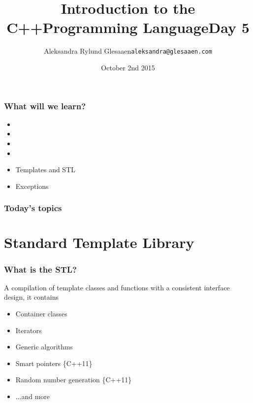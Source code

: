 \documentclass[14pt,a4paper,dvipsnames,usenames]{beamer}
\title[C++ Day5]{Introduction to the C++\newline{}Programming Language\newline{}\newline{}\fontsize{16pt}{16pt}\selectfont{}Day 5}
\author{\texorpdfstring{%
    Aleksandra Rylund Glesaaen\newline\fontsize{12pt}{12pt}\selectfont\texttt{aleksandra@glesaaen.com}%
  }{%
    Aleksandra Rylund Glesaaen}}
\date{October 2nd 2015}
\begin{document}
\begin{frame}
\titlepage
\end{frame}

\begin{frame}
  \frametitle{What will we learn?}

  \begin{itemize}
    \setlength\itemsep{.5em}
    \item {}
    \item {}
    \item {}
    \item {}
    \item Templates and STL 
    \item Exceptions 
  \end{itemize}
\end{frame}

\begin{frame}
  \frametitle{Today's topics}

  \tableofcontents
  
\end{frame}

\section{Standard Template Library}

\frame[plain]{\sectionpage}

\begin{frame}[fragile]
  \frametitle{What is the STL?}

  A compilation of template classes and functions with a consistent interface design, it contains

  \begin{itemize}
    \setlength\itemsep{.4em}
    \item Container classes
    \item Iterators
    \item Generic algorithms
    \item Smart pointers {\footnotesize\color{Tropiteal}\{C++11\}}
    \item Random number generation {\footnotesize\color{Tropiteal}\{C++11\}}
    \item ...and more
  \end{itemize}
  
\end{frame}
\end{document}
